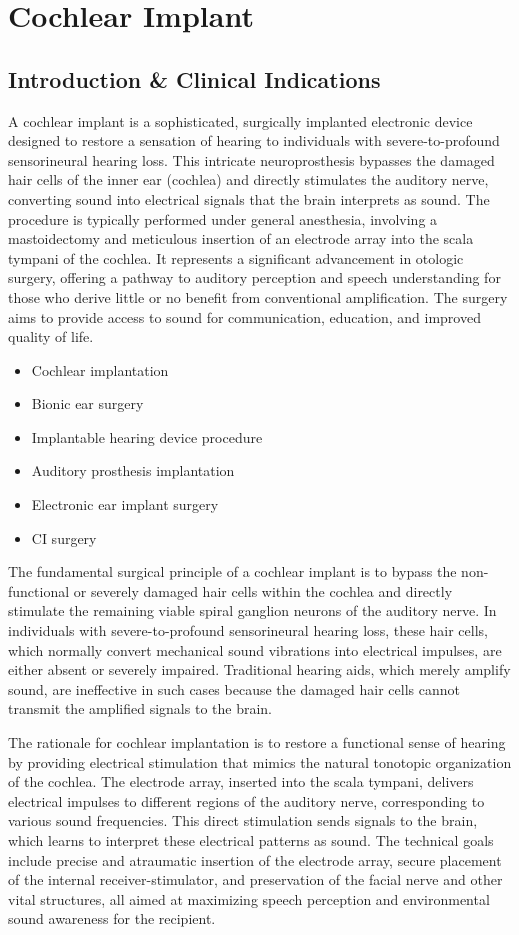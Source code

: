 \chapter{Cochlear Implant}

\section*{Introduction \& Clinical Indications}
A cochlear implant is a sophisticated, surgically implanted electronic device designed to restore a sensation of hearing to individuals with severe-to-profound sensorineural hearing loss. This intricate neuroprosthesis bypasses the damaged hair cells of the inner ear (cochlea) and directly stimulates the auditory nerve, converting sound into electrical signals that the brain interprets as sound. The procedure is typically performed under general anesthesia, involving a mastoidectomy and meticulous insertion of an electrode array into the scala tympani of the cochlea. It represents a significant advancement in otologic surgery, offering a pathway to auditory perception and speech understanding for those who derive little or no benefit from conventional amplification. The surgery aims to provide access to sound for communication, education, and improved quality of life.

\begin{itemize}
  \item Cochlear implantation
  \item Bionic ear surgery
  \item Implantable hearing device procedure
  \item Auditory prosthesis implantation
  \item Electronic ear implant surgery
  \item CI surgery
\end{itemize}

The fundamental surgical principle of a cochlear implant is to bypass the non-functional or severely damaged hair cells within the cochlea and directly stimulate the remaining viable spiral ganglion neurons of the auditory nerve. In individuals with severe-to-profound sensorineural hearing loss, these hair cells, which normally convert mechanical sound vibrations into electrical impulses, are either absent or severely impaired. Traditional hearing aids, which merely amplify sound, are ineffective in such cases because the damaged hair cells cannot transmit the amplified signals to the brain.

The rationale for cochlear implantation is to restore a functional sense of hearing by providing electrical stimulation that mimics the natural tonotopic organization of the cochlea. The electrode array, inserted into the scala tympani, delivers electrical impulses to different regions of the auditory nerve, corresponding to various sound frequencies. This direct stimulation sends signals to the brain, which learns to interpret these electrical patterns as sound. The technical goals include precise and atraumatic insertion of the electrode array, secure placement of the internal receiver-stimulator, and preservation of the facial nerve and other vital structures, all aimed at maximizing speech perception and environmental sound awareness for the recipient.

